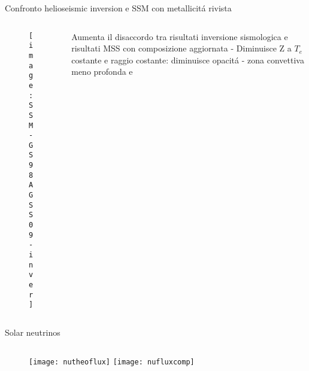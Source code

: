 \begin{frame}{Confronto helioseismic inversion e SSM con metallicit\'a rivista}
\begin{columns}[T]
	\begin{column}{0.5\textwidth}
		\begin{figure}[!ht]%
			\texttt{[image: SSM-GS98AGSS09-inver]}
		\end{figure}
	\end{column}
	\begin{column}{0.42\textwidth}
Aumenta il disaccordo tra risultati inversione sismologica e risultati MSS con composizione aggiornata - Diminuisce Z a $T_e$ costante e raggio costante: diminuisce opacit\'a - zona convettiva meno profonda e 
	\end{column}
\end{columns}
\end{frame}

\begin{frame}{Solar neutrinos}
\begin{columns}[T]
	\begin{column}{0.5\textwidth}
		\begin{figure}[!ht]%
			\texttt{[image: nutheoflux]}
				\texttt{[image: nufluxcomp]}
		\end{figure}
	\end{column}
	\begin{column}{0.5\textwidth}

	\end{column}
\end{columns}
\end{frame}
